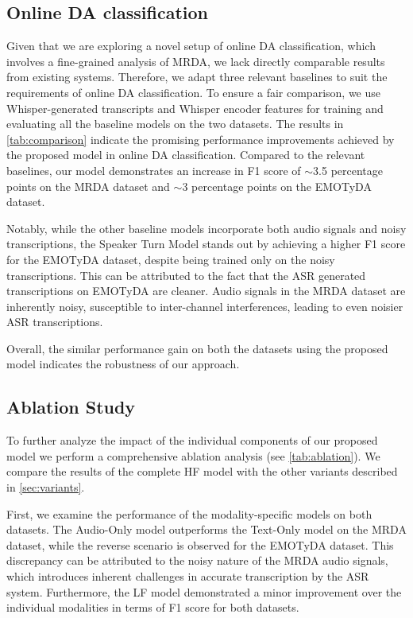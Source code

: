 \subsection{Online DA classification}
Given that we are exploring a novel setup of online DA classification, which involves a fine-grained analysis of MRDA, we lack directly comparable results from existing systems.
Therefore, we adapt three relevant baselines to suit the requirements of online DA classification.
To ensure a fair comparison, we use Whisper-generated transcripts and Whisper encoder features for training and evaluating all the baseline models on the two datasets.
The results in \autoref{tab:comparison} indicate the promising performance improvements achieved by the proposed model in online DA classification. Compared to the relevant baselines, our model demonstrates an increase in F1 score of $\sim $3.5 percentage points on the MRDA dataset and $\sim$3 percentage points on the EMOTyDA dataset.

Notably, while the other baseline models incorporate both audio signals and noisy transcriptions, the Speaker Turn Model stands out by achieving a higher F1 score for the EMOTyDA dataset, despite being trained only on the noisy transcriptions. This can be attributed to the fact that the ASR generated transcriptions on EMOTyDA are cleaner. Audio signals in the MRDA dataset are inherently noisy, susceptible to inter-channel interferences, leading to even noisier ASR transcriptions.

Overall, the similar performance gain on both the datasets using the proposed model indicates the robustness of our approach. 


\subsection{Ablation Study}
To further analyze the impact of the individual components of our proposed model we perform a comprehensive ablation analysis (see \autoref{tab:ablation}). We compare the results of the complete HF model with the other variants described in \autoref{sec:variants}.

First, we examine the performance of the modality-specific models on both datasets.
The Audio-Only model outperforms the Text-Only model on the MRDA dataset, while the reverse scenario is observed for the EMOTyDA dataset.
This discrepancy can be attributed to the noisy nature of the MRDA audio signals, which introduces inherent challenges in accurate transcription by the ASR system. Furthermore, the LF model demonstrated a minor improvement over the individual modalities in terms of F1 score for both datasets. 


